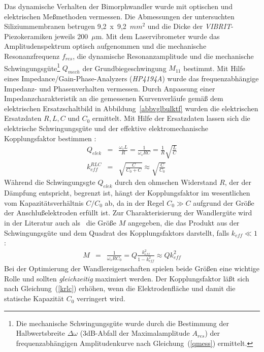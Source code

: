 Das dynamische Verhalten der Bimorphwandler wurde mit optischen und
elektrischen Meßmethoden vermessen. Die Abmessungen der untersuchten
Siliziummembranen betrugen 9,2~x~9,2~$mm^{2}$ und die Dicke der
{\sl VIBRIT}-Piezokeramiken jeweils 200~$\mu$m. Mit dem
Laservibrometer wurde das Amplitudenspektrum optisch aufgenommen und die
mechanische Resonanzfrequenz $f_{res}$, die dynamische Resonanzamplitude
und die mechanische Schwingungsgüte\footnote{Die mechanische
Schwingungsgüte wurde durch die Bestimmung der Halbwertsbreite
$\Delta \omega$ (3dB-Abfall der Maximalamplitude $A_{res}$)
der frequenzabhängigen Amplitudenkurve nach Gleichung~(\ref{qmess})
ermittelt.} $Q_{mech}$
der Grundbiegeschwingung $M_{11}$ bestimmt. Mit Hilfe eines
Impedance/Gain-Phase-Analyzers ({\sl HP4194A}) wurde das frequenzabhängige
Impedanz- und Phasenverhalten vermessen. Durch Anpassung einer
Impedanzcharakteristik an die gemessenen Kurvenverläufe gemäß dem
elektrischen Ersatzschaltbild in Abbildung~\ref{abbvglbulktf} wurden die
elektrischen Ersatzdaten $R, L, C$ und $C_{0}$ ermittelt. Mit Hilfe der
Ersatzdaten lassen sich die elektrische Schwingungsgüte und
der effektive elektromechanische Kopplungsfaktor bestimmen \cite{Til93}:
\begin{eqnarray}
\label{qkmelek}
 Q_{elek}       & = & \frac{\omega_{s}L}{R} = \frac{1}{\omega_{s}RC}
                  = \frac{1}{R} \sqrt{\frac{L}{C}} \\
\label{krlc}
 k_{eff}^{RLC}  & = & \sqrt{\frac{C}{C_{0} + C}}
                \approx \sqrt{\frac{C}{C_{0}}}
\end{eqnarray}
Während die Schwingungsgte $Q_{elek}$ durch den ohmschen Widerstand $R$,
der der Dämpfung entspricht, begrenzt ist, hängt der Kopplungsfaktor im
wesentlichen
vom Kapazitätsverhältnis $C/C_{0}$ ab, da in der Regel $C_{0} \gg C$
aufgrund der Größe der Anschlußelektroden erfüllt ist.
Zur Charakterisierung der Wandlergüte wird in der Literatur auch als
\grqq \, die Größe $M$ angegeben, die das Produkt
aus der Schwingungsgüte und dem Quadrat des Kopplungsfaktors darstellt,
falls $k_{eff} \ll 1$ \cite{IEEE}:
\begin{eqnarray}
\label{merit}
 M & = & \frac{1}{\omega_{s}RC_{0}}
     = Q \frac{k_{eff}^2}{1 - k_{eff}^2} \approx Q k_{eff}^2
\end{eqnarray}
Bei der Optimierung der Wandlereigenschaften spielen beide Größen eine
wichtige Rolle und sollten {\em gleichzeitig} maximiert werden.
Der Kopplungsfaktor läßt sich nach Gleichung~(\ref{krlc}) erhöhen, wenn die
Elektrodenfläche und damit die statische Kapazität $C_{0}$ verringert wird.

